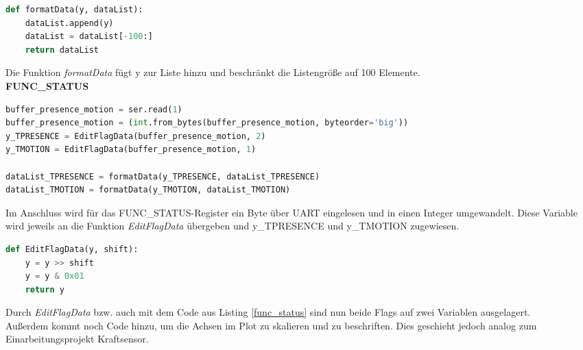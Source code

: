 \documentclass[
	letterpaper, %
	10pt, %
]{CSUniSchoolLabReport}
\begin{document}
\begin{spacing}{1.6}
\begin{lstlisting}[caption={Funktion \textit{formatData} aus dem \textsc{Python}-Skript - Projekt \glqq Infrarot-Sensor\grqq},label={lst:while1},language=python]
def formatData(y, dataList):
    dataList.append(y)
    dataList = dataList[-100:]
    return dataList
\end{lstlisting}
Die Funktion \textit{formatData} fügt y zur Liste hinzu und beschränkt die Listengröße auf 100 Elemente.\\

\textbf{FUNC\_STATUS}
\begin{lstlisting}[caption={Einlesen von FUNC\_STATUS über UART und Aufrufen der Funktionen \textit{formatData} und \textit{EditFlagData} im \textsc{Python}-Skript - Projekt \glqq Infrarot-Sensor\grqq},label={lst:func_status},language=python]
buffer_presence_motion = ser.read(1)
buffer_presence_motion = (int.from_bytes(buffer_presence_motion, byteorder='big'))
y_TPRESENCE = EditFlagData(buffer_presence_motion, 2)
y_TMOTION = EditFlagData(buffer_presence_motion, 1)
    
dataList_TPRESENCE = formatData(y_TPRESENCE, dataList_TPRESENCE)
dataList_TMOTION = formatData(y_TMOTION, dataList_TMOTION)
\end{lstlisting}
Im Anschluss wird für das FUNC\_STATUS-Register ein Byte über UART eingelesen und in einen Integer umgewandelt. Diese Variable wird jeweils an die Funktion \textit{EditFlagData} übergeben und y\_TPRESENCE und y\_TMOTION zugewiesen.

\begin{lstlisting}[caption={Funktion \textit{EditFlagData} aus dem \textsc{Python}-Skript - Projekt \glqq Infrarot-Sensor\grqq},label={lst:while1},language=python]
def EditFlagData(y, shift):
    y = y >> shift
    y = y & 0x01
    return y
\end{lstlisting}
Durch \textit{EditFlagData} bzw. auch mit dem Code aus Listing \ref{func_status} sind nun beide Flags auf zwei Variablen ausgelagert.\\
Außerdem kommt noch Code hinzu, um die Achsen im Plot zu skalieren und zu beschriften. Dies geschieht jedoch analog zum Einarbeitungsprojekt \glqq Kraftsensor\grqq.\\


\end{spacing}
\end{document}
